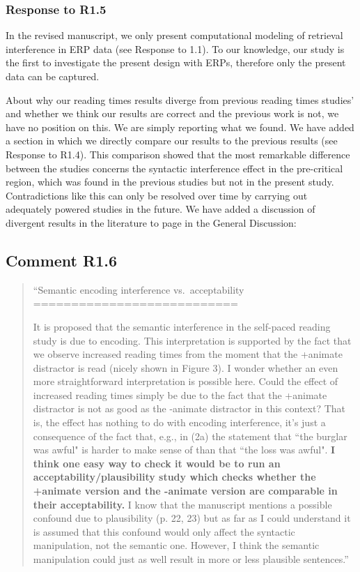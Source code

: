 \documentclass[12pt]{article}
\begin{document}
\subsubsection*{Response to R1.5}
In the revised manuscript, we only present computational modeling of retrieval interference in ERP data (see Response to 1.1). To our knowledge, our study is the first to investigate the present design with ERPs, therefore only the present data can be captured.

About why our reading times results diverge from previous reading times studies' and whether we think our results are correct and the previous work is not, we have no position on this. We are simply reporting what we found. We have added a section in which we directly compare our results to the previous results (see Response to R1.4). This comparison showed that the most remarkable difference between the studies concerns the syntactic interference effect in the pre-critical region, which was found in the previous studies but not in the present study. Contradictions like this can only be resolved over time by carrying out adequately powered studies in the future. We have added a discussion of divergent results in the literature to page \pageref{not_an_anomaly} in the General Discussion:

\begin{quote}
\end{quote}


\subsection*{Comment R1.6}
\begin{quote}
``Semantic encoding interference vs.\ acceptability\\
===========================

It is proposed that the semantic interference in the self-paced reading study is due to encoding. This interpretation is supported by the fact that we observe increased reading times from the moment that the +animate distractor is read (nicely shown in Figure 3). I wonder whether an even more straightforward interpretation is possible here. Could the effect of increased reading times simply be due to the fact that the +animate distractor is not as good as the -animate distractor in this context? That is, the effect has nothing to do with encoding interference, it's just a consequence of the fact that, e.g., in (2a) the statement that ``the burglar was awful" is harder to make sense of than that ``the loss was awful". \textbf{I think one easy way to check it would be to run an acceptability/plausibility study which checks whether the +animate version and the -animate version are comparable in their acceptability.} I know that the manuscript mentions a possible confound due to plausibility (p. 22, 23) but as far as I could understand it is assumed that this confound would only affect the syntactic manipulation, not the semantic one. However, I think the semantic manipulation could just as well result in more or less plausible sentences.''\end{quote}
\end{document}
